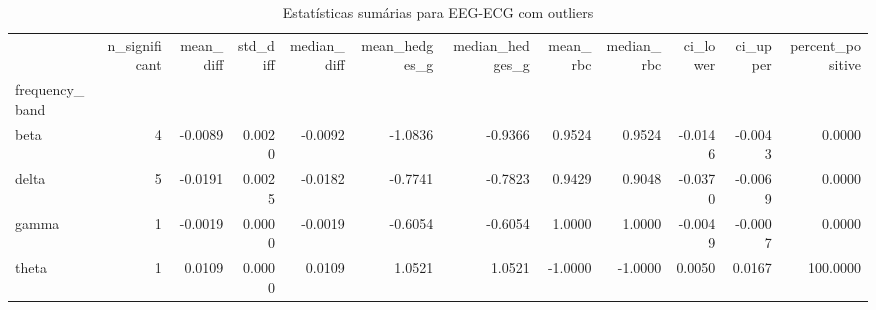 \begin{table}[htbp]
\centering
\begin{tabular}{lrrrrrrrrrrr}
\toprule
 & n\_significant & mean\_diff & std\_diff & median\_diff & mean\_hedges\_g & median\_hedges\_g & mean\_rbc & median\_rbc & ci\_lower & ci\_upper & percent\_positive \\
frequency\_band &  &  &  &  &  &  &  &  &  &  &  \\
\midrule
beta & 4 & -0.0089 & 0.0020 & -0.0092 & -1.0836 & -0.9366 & 0.9524 & 0.9524 & -0.0146 & -0.0043 & 0.0000 \\
delta & 5 & -0.0191 & 0.0025 & -0.0182 & -0.7741 & -0.7823 & 0.9429 & 0.9048 & -0.0370 & -0.0069 & 0.0000 \\
gamma & 1 & -0.0019 & 0.0000 & -0.0019 & -0.6054 & -0.6054 & 1.0000 & 1.0000 & -0.0049 & -0.0007 & 0.0000 \\
theta & 1 & 0.0109 & 0.0000 & 0.0109 & 1.0521 & 1.0521 & -1.0000 & -1.0000 & 0.0050 & 0.0167 & 100.0000 \\
\bottomrule
\end{tabular}
\caption{Estatísticas sumárias para EEG-ECG com outliers}
\label{tab:summary\_eeg\_ecg\_with}
\end{table}
